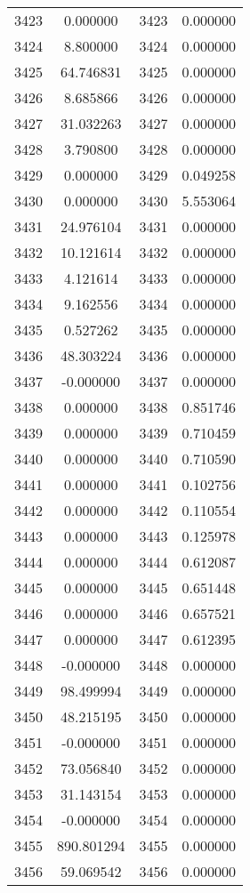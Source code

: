 \documentclass[12pt]{article}
\begin{document}
\begin{longtable}{@{}cccc@{}}
3423 & 0.000000 & 3423 & 0.000000 \\
3424 & 8.800000 & 3424 & 0.000000 \\
3425 & 64.746831 & 3425 & 0.000000 \\
3426 & 8.685866 & 3426 & 0.000000 \\
3427 & 31.032263 & 3427 & 0.000000 \\
3428 & 3.790800 & 3428 & 0.000000 \\
3429 & 0.000000 & 3429 & 0.049258 \\
3430 & 0.000000 & 3430 & 5.553064 \\
3431 & 24.976104 & 3431 & 0.000000 \\
3432 & 10.121614 & 3432 & 0.000000 \\
3433 & 4.121614 & 3433 & 0.000000 \\
3434 & 9.162556 & 3434 & 0.000000 \\
3435 & 0.527262 & 3435 & 0.000000 \\
3436 & 48.303224 & 3436 & 0.000000 \\
3437 & -0.000000 & 3437 & 0.000000 \\
3438 & 0.000000 & 3438 & 0.851746 \\
3439 & 0.000000 & 3439 & 0.710459 \\
3440 & 0.000000 & 3440 & 0.710590 \\
3441 & 0.000000 & 3441 & 0.102756 \\
3442 & 0.000000 & 3442 & 0.110554 \\
3443 & 0.000000 & 3443 & 0.125978 \\
3444 & 0.000000 & 3444 & 0.612087 \\
3445 & 0.000000 & 3445 & 0.651448 \\
3446 & 0.000000 & 3446 & 0.657521 \\
3447 & 0.000000 & 3447 & 0.612395 \\
3448 & -0.000000 & 3448 & 0.000000 \\
3449 & 98.499994 & 3449 & 0.000000 \\
3450 & 48.215195 & 3450 & 0.000000 \\
3451 & -0.000000 & 3451 & 0.000000 \\
3452 & 73.056840 & 3452 & 0.000000 \\
3453 & 31.143154 & 3453 & 0.000000 \\
3454 & -0.000000 & 3454 & 0.000000 \\
3455 & 890.801294 & 3455 & 0.000000 \\
3456 & 59.069542 & 3456 & 0.000000 \\

\end{longtable}
\end{document}
